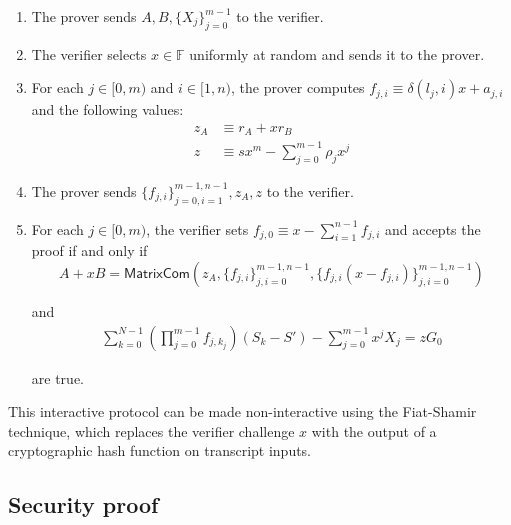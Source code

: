 \begin{appendices}
\begin{enumerate}
    Here each $p_{k,j}$ is defined such that for all $k \in [0,N)$ we have\vspace{.115cm}
    \[\prod^{m-1}_{j=0} (\delta(l_j,k_j) x + a_{j,k_{j}}) = \delta(l,k) x^m + \sum^{m-1}_{j=0} p_{k,j}{x^j}\]

    for indeterminate $x$.

    \item The prover sends $A, B, \{X_j\}^{m-1}_{j=0}$ to the verifier.

    \item The verifier selects $x \in \mathbb{F}$ uniformly at random and sends it to the prover.

    \item For each $j \in [0,m)$ and $i \in [1,n)$, the prover computes $f_{j,i} \equiv \delta(l_j,i) x + a_{j,i}$ and the following values:
    \begin{align*}
        z_A &\equiv r_A + x r_B \\
        z   &\equiv s x^m - \sum^{m-1}_{j=0} \rho_j x^j
    \end{align*}

    \item The prover sends $\{f_{j,i}\}^{m-1,n-1}_{j=0,i=1}, z_A, z$ to the verifier.

    \item For each $j \in [0,m)$, the verifier sets $f_{j,0} \equiv x - \sum^{n-1}_{i=1} f_{j,i}$ and accepts the proof if and only if\vspace{.115cm}
    \[A + x B = \mathsf{MatrixCom} \left(z_A, \{f_{j,i}\}^{m-1,n-1}_{j,i=0}, \{f_{j,i}(x - f_{j,i})\}^{m-1,n-1}_{j,i=0} \right)\]

    and\vspace{.115cm}
    \begin{align*}
        \sum^{N-1}_{k=0} \left(\prod^{m-1}_{j=0} f_{j,{k_j}} \right) (S_k - S') - \sum^{m-1}_{j=0} x^j X_j = z G_0
    \end{align*}

    are true.
\end{enumerate}

This interactive protocol can be made non-interactive using the Fiat-Shamir technique, which replaces the verifier challenge $x$ with the output of a cryptographic hash function on transcript inputs.


\subsection{Security proof}
\label{appendix:grootle-proof-security}


\end{appendices}

